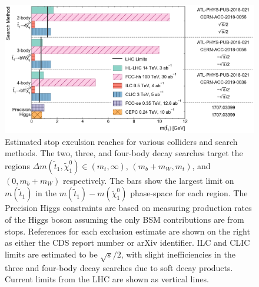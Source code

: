 \documentclass[11pt]{article}
\begin{document}
\begin{figure}
    \centering
    \includegraphics[width=\textwidth]{stop.png}
    \caption{Estimated stop exculsion reaches for various colliders and search methods. 
    The two, three, and four-body decay searches target the regions $\Delta m(\widetilde{t}_1, \widetilde{\chi}_1^0) \in (m_t, \infty)$, $(m_b + m_W, m_t)$, and $(0, m_b + m_W)$ respectively. 
    The bars show the largest limit on $m(\widetilde{t}_1)$ in the $m(\widetilde{t}_1)-m(\widetilde{\chi}_1^0)$ phase-space for each region. 
    The Precision Higgs constraints are based on measuring production rates of the Higgs boson assuming the only BSM contributions are from stops. 
    References for each exclusion estimate are shown on the right as either the CDS report number or arXiv identifier. 
    ILC and CLIC limits are estimated to be $\sqrt{s}/2$, with slight inefficiencies in the three and four-body decay searches due to soft decay products. Current limits from the LHC \cite{ATL-PHYS-PUB-2022-013} are shown as vertical lines. }
\end{figure}
\end{document}
